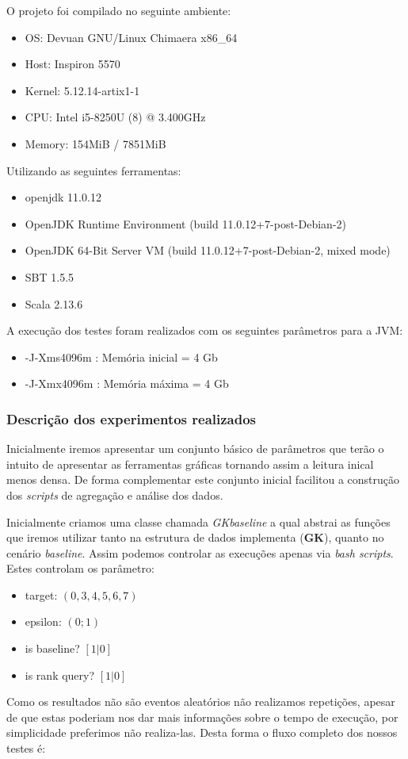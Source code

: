 \documentclass[11pt]{article}
\begin{document}
O projeto foi compilado no seguinte ambiente:
\begin{itemize}
  \item OS: Devuan GNU/Linux Chimaera x86\_64
  \item Host: Inspiron 5570
  \item Kernel: 5.12.14-artix1-1
  \item CPU: Intel i5-8250U (8) @ 3.400GHz
  \item Memory: 154MiB / 7851MiB
\end{itemize}

Utilizando as seguintes ferramentas:
\begin{itemize}
  \item openjdk 11.0.12
  \item OpenJDK Runtime Environment (build 11.0.12+7-post-Debian-2)
  \item OpenJDK 64-Bit Server VM (build 11.0.12+7-post-Debian-2, mixed mode)
  \item SBT 1.5.5
  \item Scala 2.13.6
\end{itemize}

A execução dos testes foram realizados com os seguintes parâmetros para a JVM:
\begin{itemize}
  \item -J-Xms4096m : Memória inicial = 4 Gb
  \item -J-Xmx4096m : Memória máxima = 4 Gb
\end{itemize}

\subsubsection{Descrição dos experimentos realizados}
Inicialmente iremos apresentar um conjunto básico de parâmetros que terão o intuito de apresentar as ferramentas gráficas tornando assim a leitura inical menos densa. De forma complementar este conjunto inicial facilitou a construção dos \emph{scripts} de agregação e análise dos dados.

Inicialmente criamos uma classe chamada \emph{GKbaseline} a qual abstrai as funções que iremos utilizar tanto na estrutura de dados implementa (\textbf{GK}), quanto no cenário \emph{baseline}. Assim podemos controlar as execuções apenas via \emph{bash scripts}. Estes controlam os parâmetro:
\begin{itemize}
  \item target: $(0, 3, 4, 5, 6, 7)$
  \item epsilon: $(0;1)$
  \item is baseline? $[1 | 0]$
  \item is rank query? $[1 | 0]$
\end{itemize}
Como os resultados não são eventos aleatórios não realizamos repetições, apesar de que estas poderiam nos dar mais informações sobre o tempo de execução, por simplicidade preferimos não realiza-las. Desta forma o fluxo completo dos nossos testes é:
\end{document}
